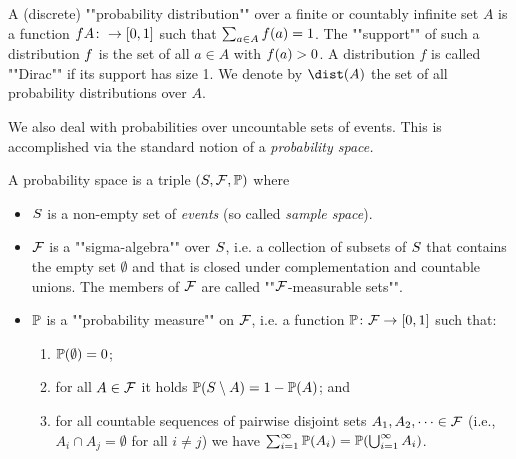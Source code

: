 A (discrete) ""probability distribution"" over a finite or countably infinite set $A$ is a function $f A \colon \rightarrow [0,1]$ such that $\sum_{a\in A}f(a)=1$. The ""support"" of such a distribution $f$ is the set of all $a\in A$ with $f(a)>0$. A distribution $f$ is called ""Dirac"" if its support has size 1.
We denote by $\dist(A)$ the set of all probability distributions over $A$.


We also deal with probabilities over uncountable sets of events. This is accomplished via the standard notion of a \emph{probability space.}

\begin{definition}
\label{5-def:probspace}
A probability space is a triple
$(S,\mathcal{F},\mathbb{P})$ where
\begin{itemize}
\item
$S$ is a non-empty set of \emph{events} (so called
\emph{sample space}). 

\item
$\mathcal{F}$ is a ""sigma-algebra"" over $S$,
i.e. a collection of subsets of $S$ that contains the empty set
$\emptyset$ and that is closed under complementation and countable unions. The members of $\mathcal{F}$ are called ""$\mathcal{F}$-measurable 
sets"".

\item
$\mathbb{P}$ is a ""probability measure"" on $\mathcal{F}$, i.e. a function
$\mathbb{P}\colon \mathcal{F}\rightarrow[0,1]$ such that:
\begin{enumerate}
\item
$\mathbb{P}(\emptyset)=0$;

\item
for all $A\in \mathcal{F}$ it holds $\mathbb{P}(S \setminus
A)=1-\mathbb{P}(A)$; and

\item
for all countable sequences of pairwise disjoint sets $A_1,A_2,\dots \in \mathcal{F}$ (i.e., $A_i \cap A_j = \emptyset$ for all $i\neq j$)
we have $\sum_{i=1}^{\infty}\mathbb{P}(A_i)=\mathbb{P}(\bigcup_{i=1}^{\infty} A_i)$.
\end{enumerate}
\end{itemize}
\end{definition}

